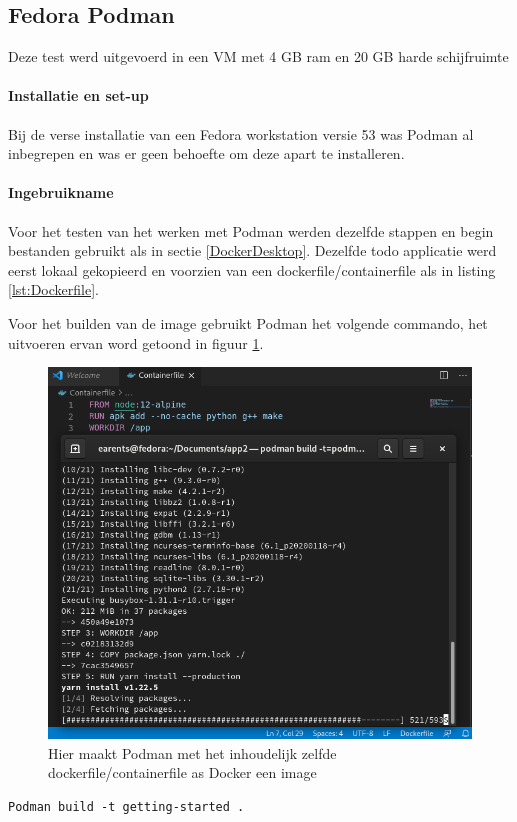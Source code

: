 \subsection{Fedora Podman}
Deze test werd uitgevoerd in een VM met 4 GB ram en 20 GB harde schijfruimte
\paragraph{Installatie en set-up}
Bij de verse installatie van een Fedora workstation versie 53 was Podman al inbegrepen en was er geen behoefte om deze apart te installeren.

\paragraph{Ingebruikname}
Voor het testen van het werken met Podman werden dezelfde stappen en begin bestanden gebruikt als in sectie \ref{DockerDesktop}. Dezelfde todo applicatie werd eerst lokaal gekopieerd en voorzien van een dockerfile/containerfile als in listing \ref{lst:Dockerfile}.

Voor het builden van de image gebruikt Podman het volgende commando, het uitvoeren ervan word getoond in figuur \ref{fig:podmanbuild}.
\begin{figure}[h]
    \includegraphics[width=\linewidth]{img/podmanbuild.png}
    \caption[Met podman een containerfile builden]{Hier maakt Podman met het inhoudelijk zelfde dockerfile/containerfile as Docker een image}
    \label{fig:podmanbuild}
    \centering
\end{figure}
\begin{verbatim}
Podman build -t getting-started .
\end{verbatim}
 
